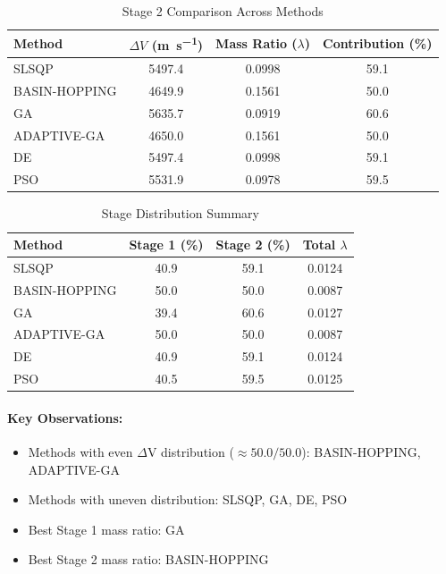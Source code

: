 \documentclass{article}
\begin{document}
\begin{table}[H]
\centering
\caption{Stage 2 Comparison Across Methods}
\begin{tabular}{lS[table-format=4.1]S[table-format=1.4]S[table-format=3.1]}
\toprule
Method & {$\Delta V$ (\si{\meter\per\second})} & {Mass Ratio ($\lambda$)} & {Contribution (\%)} \\
\midrule
SLSQP        & 5497.4 & 0.0998 & 59.1 \\
BASIN-HOPPING & 4649.9 & 0.1561 & 50.0 \\
GA           & 5635.7 & 0.0919 & 60.6 \\
ADAPTIVE-GA  & 4650.0 & 0.1561 & 50.0 \\
DE           & 5497.4 & 0.0998 & 59.1 \\
PSO          & 5531.9 & 0.0978 & 59.5 \\
\bottomrule
\end{tabular}
\end{table}

\begin{table}[H]
\centering
\caption{Stage Distribution Summary}
\begin{tabular}{lS[table-format=4.1]S[table-format=4.1]S[table-format=1.4]}
\toprule
Method & {Stage 1 (\%)} & {Stage 2 (\%)} & {Total $\lambda$} \\
\midrule
SLSQP        & 40.9 & 59.1 & 0.0124 \\
BASIN-HOPPING & 50.0 & 50.0 & 0.0087 \\
GA           & 39.4 & 60.6 & 0.0127 \\
ADAPTIVE-GA  & 50.0 & 50.0 & 0.0087 \\
DE           & 40.9 & 59.1 & 0.0124 \\
PSO          & 40.5 & 59.5 & 0.0125 \\
\bottomrule
\end{tabular}
\end{table}

\paragraph{Key Observations:}
\begin{itemize}
\item Methods with even $\Delta$V distribution ($\approx50.0/50.0$): BASIN-HOPPING, ADAPTIVE-GA
\item Methods with uneven distribution: SLSQP, GA, DE, PSO
\item Best Stage 1 mass ratio: GA
\item Best Stage 2 mass ratio: BASIN-HOPPING
\end{itemize}
\end{document}
